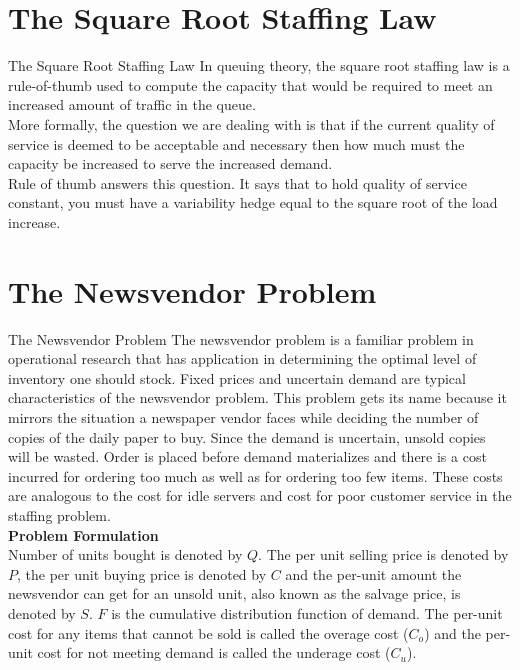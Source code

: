 \documentclass[9pt]{beamer}
\begin{document}
\section{The Square Root Staffing Law}
\begin{frame}{The Square Root Staffing Law}
In queuing theory, the square root staffing law is a rule-of-thumb used to compute the capacity that would be required to meet an increased amount of traffic in the queue. \\ \bigskip More formally, the question we are dealing with is that if the current quality of service is deemed to be acceptable and necessary then how much must the capacity be increased to serve the increased demand. \\ \bigskip Rule of thumb answers this question. It says that to hold quality of service constant, you must have a variability hedge equal to the square root of the load increase.
\end{frame}

\section{The Newsvendor Problem}
\begin{frame}{The Newsvendor Problem}
The newsvendor problem is a familiar problem in operational research that has application in determining the optimal level of inventory one should stock. Fixed prices and uncertain demand are typical characteristics of the newsvendor problem. This problem gets its name because it mirrors the situation a newspaper vendor faces while deciding the number of copies of the daily paper to buy. Since the demand is uncertain, unsold copies will be wasted. Order is placed before demand materializes and there is a cost incurred for ordering too much as well as for ordering too few items. These costs are analogous to the cost for idle servers and cost for poor customer service in the staffing problem. 
\\ \bigskip \textbf{Problem Formulation} \\Number of units bought is denoted by $Q$. The per unit selling price is denoted by $P$, the per unit buying price is denoted by $C$ and the per-unit amount the newsvendor can get for an unsold unit, also known as the salvage price, is denoted by $S$. $F$ is the cumulative distribution function of demand. The per-unit cost for any items that cannot be sold is called the overage cost ($C_o$) and the per-unit cost for not meeting demand is called the  underage cost ($C_u$). 
\end{frame}
\end{document}
